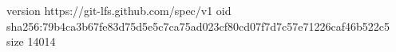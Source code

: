 version https://git-lfs.github.com/spec/v1
oid sha256:79b4ca3b67fe83d75d5e5c7ca75ad023cf80cd07f7d7c57e71226caf46b522c5
size 14014
